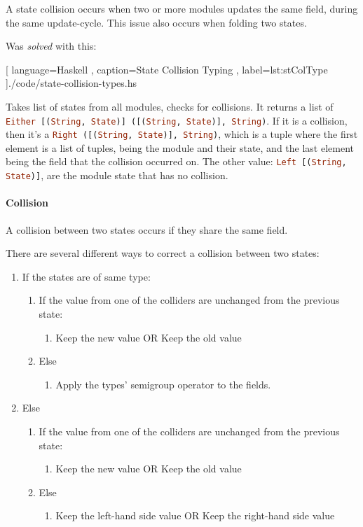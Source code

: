 A state collision occurs when two or more modules updates the same field, during
the same update-cycle. This issue also occurs when folding two states.

Was \textit{solved} with this:

\begin{center}
  
  [ language=Haskell
  , caption={State Collision Typing}
  , label=lst:stColType
  ]{./code/state-collision-types.hs}
\end{center}

Takes list of states from all modules, checks for collisions. It returns a
list of
\lstinline[language=Haskell]{Either [(String, State)] ([(String, State)], String)}.
If it is a collision, then it's a
\lstinline[language=Haskell]{Right ([(String, State)], String)}, which is a
tuple where the first element is a list of tuples, being the module and their
state, and the last element being the field that the collision occurred on.
The other value: \lstinline[language=Haskell]{Left [(String, State)]}, are the
module state that has no collision.

\paragraph{Collision} A collision between two states occurs if they share the same
field.

There are several different ways to correct a collision between two
states:

\begin{enumerate}
  \item If the states are of same type:
    \begin{enumerate}
      \item If the value from one of the colliders are unchanged from the previous state:
        \begin{enumerate}
          \item Keep the new value OR Keep the old value
        \end{enumerate}
      \item Else
        \begin{enumerate}
          \item Apply the types' semigroup operator to the fields.
        \end{enumerate}
    \end{enumerate}
  \item Else
    \begin{enumerate}
      \item If the value from one of the colliders are unchanged from the previous state:
        \begin{enumerate}
          \item Keep the new value OR Keep the old value
        \end{enumerate}
      \item Else
        \begin{enumerate}
          \item Keep the left-hand side value OR Keep the right-hand side value
        \end{enumerate}
    \end{enumerate}
\end{enumerate}

